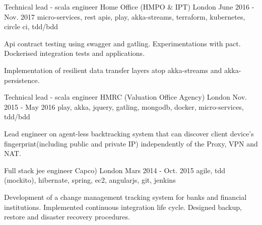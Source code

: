 \begin{cventries}
  \cventry
    {Technical lead - scala engineer} %
    {\hspace{0.5em}Home Office (HMPO \& IPT)} %
    {London} %
    {June 2016 - Nov. 2017} %
    {micro-services, rest apis, play, akka-streams, terraform, kubernetes, circle ci, tdd/bdd} %
    {
      \begin{cvitems} %
        \item {Api contract testing using swagger and gatling. Experimentations with pact. Dockerised integration tests and applications.}
        \item {Implementation of resilient data transfer layers atop akka-streams and akka-persistence.}
      \end{cvitems}
    }

  \cventry
    {Technical lead - scala engineer} %
    {\hspace{0.5em}HMRC (Valuation Office Agency)} %
    {London} %
    {Nov. 2015 - May 2016} %
    {play, akka, jquery, gatling, mongodb, docker, micro-services, tdd/bdd} %
    {
      \begin{cvitems} %
        \item {Lead engineer on agent-less backtracking system that can discover client device's fingerprint(including public and private IP) independently of the Proxy, VPN and NAT.}
      \end{cvitems}
    }

  \cventry
    {Full stack jee engineer} %
    {\hspace{0.5em}Capco)} %
    {London} %
    {Mars 2014 - Oct. 2015} %
    {agile, tdd (mockito), hibernate, spring, ec2, angularjs, git, jenkins} %
    {
      \begin{cvitems} %
        \item {Development of a change management tracking system for banks and financial institutions. Implemented continuous integration life cycle. Designed backup, restore and disaster recovery procedures.}
      \end{cvitems}
    }


\end{cventries}
